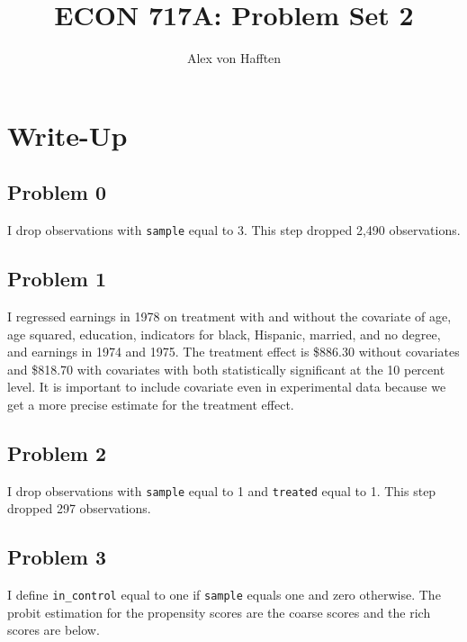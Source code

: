 \documentclass{article}
\title{ECON 717A: Problem Set 2}
\author{Alex von Hafften }
\begin{document}
\maketitle

\section{Write-Up}

\subsection*{Problem 0}

I drop observations with \texttt{sample} equal to 3.  This step dropped 2,490 observations.

\subsection*{Problem 1}

I regressed earnings in 1978 on treatment with and without the covariate of age, age squared, education, indicators for black, Hispanic, married, and no degree, and earnings in 1974 and 1975.  The treatment effect is \$886.30 without covariates and \$818.70 with covariates with both statistically significant at the 10 percent level.  It is important to include covariate even in experimental data because we get a more precise estimate for the treatment effect.

\begin{center}

\end{center}

\pagebreak

\subsection*{Problem 2}

I drop observations with \texttt{sample} equal to 1 and \texttt{treated} equal to 1.  This step dropped 297 observations.

\subsection*{Problem 3}

I define \texttt{in\_control} equal to one if \texttt{sample} equals one and zero otherwise.  The probit estimation for the propensity scores are the coarse scores and the rich scores are below.

\begin{center}

\end{center}
\end{document}
